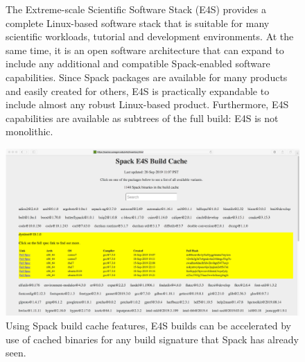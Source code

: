 \begin{figure}
	\centering
	\caption{The Extreme-scale Scientific Software Stack (E4S) provides a complete Linux-based software stack that is suitable for many scientific workloads, tutorial and development environments.  At the same time, it is an open software architecture that can expand to include any additional and compatible Spack-enabled software capabilities. Since Spack packages are available for many products and easily created for others, E4S is practically expandable to include almost any robust Linux-based product.  Furthermore, E4S capabilities are available as subtrees of the full build: E4S is not monolithic.}
	\label{fig:e4s-is-isnot}
\end{figure}

\begin{figure}
	\centering
	\includegraphics[width=0.9\linewidth]{E4S-Build-Cache-Binaries}
	\caption{Using Spack build cache features, E4S builds can be accelerated by use of cached binaries for any build signature that Spack has already seen.}
	\label{fig:e4s-build-cache}
\end{figure}

